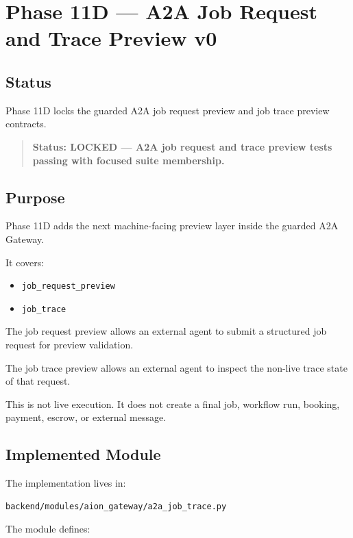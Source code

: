 \section{Phase 11D --- A2A Job Request and Trace Preview v0}
\label{sec:aion-a2a-job-request-trace-preview-v0}

\subsection{Status}

Phase 11D locks the guarded A2A job request preview and job trace preview contracts.

\begin{quote}
\textbf{Status: LOCKED --- A2A job request and trace preview tests passing with focused suite membership.}
\end{quote}

\subsection{Purpose}

Phase 11D adds the next machine-facing preview layer inside the guarded A2A Gateway.

It covers:

\begin{itemize}
  \item \texttt{job\_request\_preview}
  \item \texttt{job\_trace}
\end{itemize}

The job request preview allows an external agent to submit a structured job request for preview validation.

The job trace preview allows an external agent to inspect the non-live trace state of that request.

This is not live execution. It does not create a final job, workflow run, booking, payment, escrow, or external message.

\subsection{Implemented Module}

The implementation lives in:

\begin{verbatim}
backend/modules/aion_gateway/a2a_job_trace.py
\end{verbatim}

The module defines:

